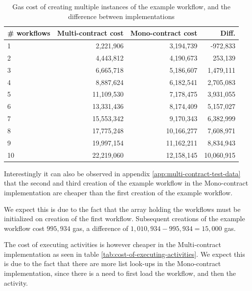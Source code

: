 \documentclass{article}
\begin{document}
	\begin{table}[!ht]
		\centering
		\label{tab:cost-of-creating-multiple-workflows}
		\begin{tabular}{| p{1.9cm} | r | r | r |}
			\hline
			\# workflows 		& Multi-contract cost 	& Mono-contract cost	& Diff.   		\\\hline
			1                   & 2,221,906             & 3,194,739         	& -972,833 		\\\hline
			2                   & 4,443,812             & 4,190,673         	& 253,139  		\\\hline
			3                   & 6,665,718             & 5,186,607         	& 1,479,111 	\\\hline
			4                   & 8,887,624             & 6,182,541         	& 2,705,083 	\\\hline
			5                   & 11,109,530            & 7,178,475         	& 3,931,055 	\\\hline
			6                   & 13,331,436            & 8,174,409         	& 5,157,027 	\\\hline
			7                   & 15,553,342            & 9,170,343         	& 6,382,999 	\\\hline
			8                   & 17,775,248            & 10,166,277        	& 7,608,971 	\\\hline
			9                   & 19,997,154            & 11,162,211        	& 8,834,943 	\\\hline
			10                  & 22,219,060            & 12,158,145        	& 10,060,915    \\\hline
		\end{tabular}      
		\caption{Gas cost of creating multiple instances of the example workflow, and the difference between implementations}
	\end{table}

	Interestingly it can also be observed in appendix \ref{app:multi-contract-test-data} that the second and third creation of the example workflow in the Mono-contract implementation are cheaper than the first creation of the example workflow.

	We expect this is due to the fact that the array holding the workflows must be initialized on creation of the first workflow.
	Subsequent creations of the example workflow cost $995,934$ gas, a difference of $1,010,934 - 995,934 = 15,000$ gas.	

	The cost of executing activities is however cheaper in the Multi-contract implementation as seen in table \ref{tab:cost-of-executing-activities}.
	We expect this is due to the fact that there are more list look-ups in the Mono-contract implementation, since there is a need to first load the workflow, and then the activity.
\end{document}
